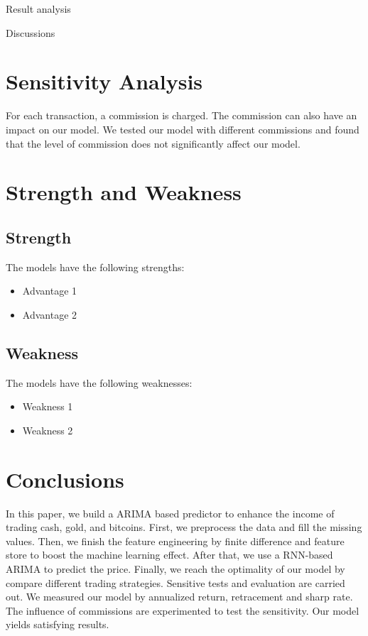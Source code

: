 \documentclass[12pt,a4paper]{article}
\newcommand{\Predictor}{ARIMA }
\begin{document}
\begin{spacing}{1.2}
Result analysis

Discussions



\section{Sensitivity Analysis}
\label{SensitivityAnalysis}

For each transaction, a commission is charged. The commission can also have an impact on our model. We tested our model with different commissions and found that the level of commission does not significantly affect our model.

\section{Strength and Weakness}
\label{Strength_Weakness}


\subsection{Strength}

The models have the following strengths:

\begin{itemize}
\item Advantage 1

\item Advantage 2
\end{itemize}


\subsection{Weakness}

The models have the following weaknesses:

\begin{itemize}
\item Weakness 1

\item Weakness 2
\end{itemize}


\section{Conclusions}
\label{Conclusions}

In this paper, we build a \Predictor based predictor to enhance the income of trading cash, gold, and bitcoins. First, we preprocess the data and fill the missing values. Then, we finish the feature engineering by finite difference and feature store to boost the machine learning effect. After that, we use a RNN-based \Predictor to predict the price. Finally, we reach the optimality of our model by compare different trading strategies. Sensitive tests and evaluation are carried out. We measured our model by annualized return, retracement and sharp rate. The influence of commissions are experimented to test the sensitivity. Our model yields satisfying results.





\end{spacing}
\end{document}

